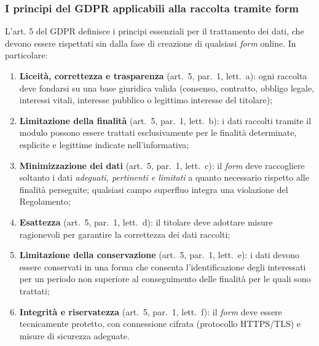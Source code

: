 \documentclass[12pt, a4paper]{article}
\begin{document}
\subsubsection{I principi del GDPR applicabili alla raccolta tramite form}
\label{subsub:principi}

L'art. 5 del GDPR definisce i principi essenziali per il trattamento dei dati, 
che devono essere rispettati sin dalla fase di creazione di qualsiasi \emph{form} online.
In particolare:

\begin{enumerate}[label=\alph*), leftmargin=1.5cm]
  \item \textbf{Liceità, correttezza e trasparenza} (art.~5, par.~1, lett.~a):
        ogni raccolta deve fondarsi su una base giuridica valida (consenso,
        contratto, obbligo legale, interessi vitali, interesse pubblico o legittimo
        interesse del titolare);

  \item \textbf{Limitazione della finalità} (art.~5, par.~1, lett.~b):
        i dati raccolti tramite il modulo possono essere trattati esclusivamente
        per le finalità determinate, esplicite e legittime indicate nell'informativa;

  \item \textbf{Minimizzazione dei dati} (art.~5, par.~1, lett.~c):
        il \emph{form} deve raccogliere soltanto i dati \emph{adeguati, pertinenti
        e limitati} a quanto necessario rispetto alle finalità perseguite;
        qualsiasi campo superfluo integra una violazione del Regolamento;

  \item \textbf{Esattezza} (art.~5, par.~1, lett.~d): il titolare deve
        adottare misure ragionevoli per garantire la correttezza dei dati
        raccolti;

  \item \textbf{Limitazione della conservazione} (art.~5, par.~1, lett.~e):
        i dati devono essere conservati in una forma che consenta l'identificazione
        degli interessati per un periodo non superiore al conseguimento delle
        finalità per le quali sono trattati;

  \item \textbf{Integrità e riservatezza} (art.~5, par.~1, lett.~f):
        il \emph{form} deve essere tecnicamente protetto, con connessione
        cifrata (protocollo HTTPS/TLS) e misure di sicurezza adeguate.
\end{enumerate}
\end{document}
